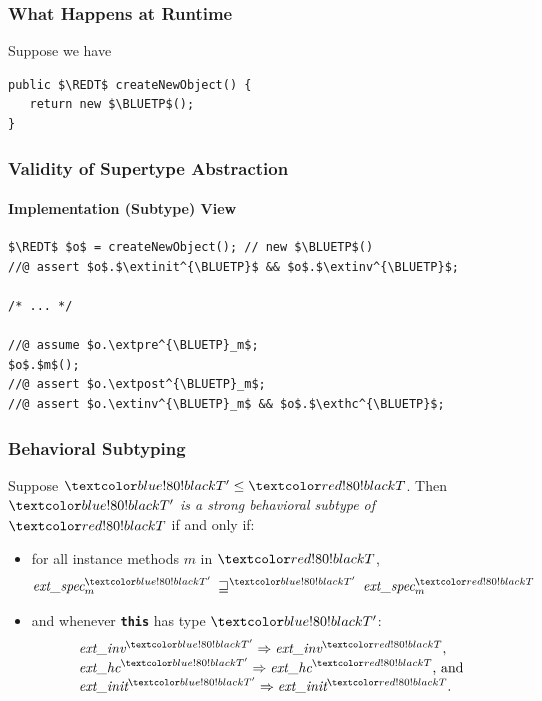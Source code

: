 \begin{frame}[fragile]
\frametitle{What Happens at Runtime}

Suppose we have

\begin{lstlisting}[mathescape=true]
public $\REDT$ createNewObject() {
   return new $\BLUETP$();
}
\end{lstlisting}
\end{frame}


\begin{frame}[fragile]
\frametitle{Validity of Supertype Abstraction}
\framesubtitle{Implementation (Subtype) View}

\begin{lstlisting}[mathescape=true]
$\REDT$ $o$ = createNewObject(); // new $\BLUETP$()
//@ assert $o$.$\extinit^{\BLUETP}$ && $o$.$\extinv^{\BLUETP}$;

/* ... */

//@ assume $o.\extpre^{\BLUETP}_m$;
$o$.$m$();
//@ assert $o.\extpost^{\BLUETP}_m$;
//@ assert $o.\extinv^{\BLUETP}_m$ && $o$.$\exthc^{\BLUETP}$;
\end{lstlisting}
\end{frame}

\begin{frame}
\frametitle{Behavioral Subtyping}
\begin{definition}
Suppose $\BLUETP \STO \REDT$.  Then \\
$\BLUETP$ \emph{is a strong behavioral subtype of} $\REDT$
if and only if:

\begin{itemize}
\item
for all instance methods $m$ in $\REDT$,
\begin{displaymath}
\extspec^{\BLUETP}_m \:\sqsupseteq^{\BLUETP}\: \extspec^{\REDT}_m
\end{displaymath}

\item
and whenever \textbf{\texttt{this}} has type $\BLUETP$:
\begin{displaymath}
\begin{array}{l}
\extinv^{\BLUETP} \Rightarrow \extinv^{\REDT}, \\
\exthc^{\BLUETP} \Rightarrow \exthc^{\REDT}\mbox{, and}\\
\extinit^{\BLUETP} \Rightarrow \extinit^{\REDT}.
\end{array}
\end{displaymath}
\end{itemize}
\end{definition}
\end{frame}

